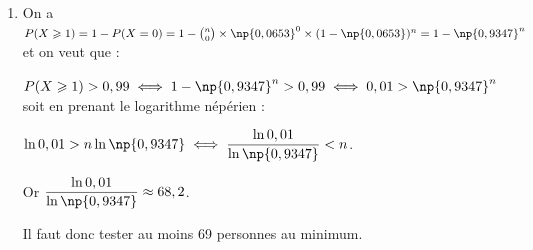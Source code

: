 \begin{enumerate}
\begin{enumerate}
$ 45 \times \np{0,0653}^2 \times 0,9347^{8} \approx \np{0,1118}$, soit $0,11$ à $10^{-2}$ près.
	\end{enumerate}
\item 
On a $P(X \geqslant 1) = 1 - P(X = 0) = 1 - \binom{n}{0} \times \np{0,0653}^0 \times (1 - \np{0,0653})^{n} = 1 - \np{0,9347}^n$ et on veut que :

$P(X \geqslant 1) > 0,99 \iff 1 - \np{0,9347}^{n} > 0,99 \iff 0,01 > \np{0,9347}^{n}$ soit en prenant le logarithme népérien :

$\ln 0,01 > n\ln \np{0,9347} \iff \dfrac{\ln 0,01}{\ln \np{0,9347}}< n$.

Or $\dfrac{\ln 0,01}{\ln \np{0,9347}} \approx 68,2$. 

Il faut donc tester au moins 69 personnes au minimum.
\end{enumerate}
